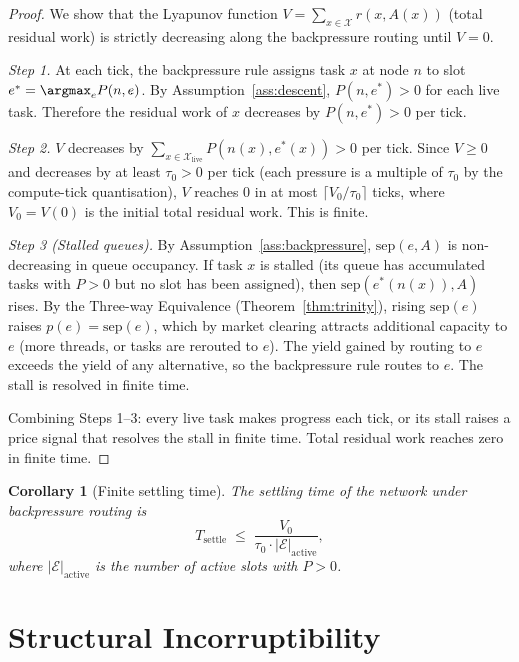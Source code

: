 \documentclass[11pt,twocolumn,a4paper]{article}
\theoremstyle{plain}
\newtheorem{corollary}[theorem]{Corollary}
\theoremstyle{definition}
\theoremstyle{remark}
\newcommand{\E}{\mathcal{E}}
\newcommand{\X}{\mathcal{X}}
\newcommand{\tick}{\tau_0}
\newcommand{\sep}{\mathrm{sep}}
\newcommand{\pres}{P}
\begin{document}
\begin{proof}
We show that the Lyapunov function $V = \sum_{x \in \X} r(x, A(x))$ (total residual work) is strictly decreasing along the backpressure routing until $V = 0$.

\emph{Step 1.} At each tick, the backpressure rule assigns task $x$ at node $n$ to slot $e^* = \argmax_{e} \pres(n,e)$. By Assumption~\ref{ass:descent}, $\pres(n, e^*) > 0$ for each live task. Therefore the residual work of $x$ decreases by $\pres(n, e^*) > 0$ per tick.

\emph{Step 2.} $V$ decreases by $\sum_{x \in \X_{\mathrm{live}}} \pres(n(x), e^*(x)) > 0$ per tick. Since $V \geq 0$ and decreases by at least $\tick > 0$ per tick (each pressure is a multiple of $\tick$ by the compute-tick quantisation), $V$ reaches $0$ in at most $\lceil V_0 / \tick \rceil$ ticks, where $V_0 = V(0)$ is the initial total residual work. This is finite.

\emph{Step 3 (Stalled queues).} By Assumption~\ref{ass:backpressure}, $\sep(e, A)$ is non-decreasing in queue occupancy. If task $x$ is stalled (its queue has accumulated tasks with $\pres > 0$ but no slot has been assigned), then $\sep(e^*(n(x)), A)$ rises. By the Three-way Equivalence (Theorem~\ref{thm:trinity}), rising $\sep(e)$ raises $p(e) = \sep(e)$, which by market clearing attracts additional capacity to $e$ (more threads, or tasks are rerouted to $e$). The yield gained by routing to $e$ exceeds the yield of any alternative, so the backpressure rule routes to $e$. The stall is resolved in finite time.

Combining Steps 1--3: every live task makes progress each tick, or its stall raises a price signal that resolves the stall in finite time. Total residual work reaches zero in finite time.
\end{proof}

\begin{corollary}[Finite settling time]
\label{cor:settling}
The settling time of the network under backpressure routing is
\[
  T_{\mathrm{settle}} \;\leq\; \frac{V_0}{\tick \cdot |\E|_{\mathrm{active}}},
\]
where $|\E|_{\mathrm{active}}$ is the number of active slots with $\pres > 0$.
\end{corollary}

\section{Structural Incorruptibility}
\label{sec:incorruptibility}
\end{document}
